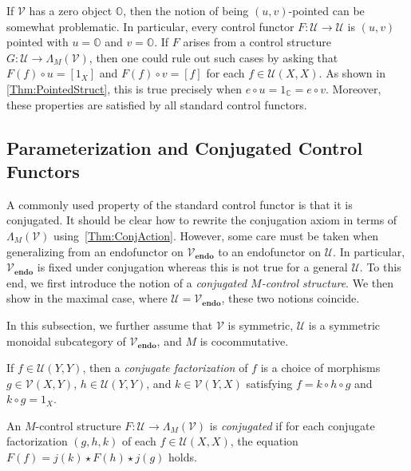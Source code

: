 \begin{exa}
    If $\mathcal{V}$ has a zero object $\mathbb{O}$, then the notion of being $( u, v )$-pointed can be somewhat problematic.
    In particular, every control functor $F: \mathcal{U} \to \mathcal{U}$ is $( u, v )$ pointed with $u = \mathbb{O}$ and $v = \mathbb{O}$.
    If $F$ arises from a control structure $G: \mathcal{U} \to \Lambda_M( \mathcal{V} )$, then one could rule out such cases by asking that $F( f ) \circ u = [ 1_X ]$ and $F( f ) \circ v = [ f ]$ for each $f \in \mathcal{U}( X, X )$.
    As shown in \cref{Thm:PointedStruct}, this is true precisely when $e \circ u = 1_{\mathbb{C}} = e \circ v$.
    Moreover, these properties are satisfied by all standard control functors.
\end{exa}

\subsection{Parameterization and Conjugated Control Functors}
%
A commonly used property of the standard control functor is that it is conjugated.
It should be clear how to rewrite the conjugation axiom in terms of $\Lambda_M( \mathcal{V} )$ using~\cref{Thm:ConjAction}.
However, some care must be taken when generalizing from an endofunctor on $\mathcal{V}_{\mathbf{endo}}$ to an endofunctor on $\mathcal{U}$.
In particular, $\mathcal{V}_{\mathbf{endo}}$ is fixed under conjugation whereas this is not true for a general $\mathcal{U}$.
To this end, we first introduce the notion of a \emph{conjugated $M$-control structure}.
We then show in the maximal case, where $\mathcal{U} = \mathcal{V}_{\mathbf{endo}}$, these two notions coincide.

\begin{nota}
    In this subsection, we further assume that $\mathcal{V}$ is symmetric, $\mathcal{U}$ is a symmetric monoidal subcategory of $\mathcal{V}_{\mathbf{endo}}$, and $M$ is cocommutative.
\end{nota}

\begin{defi}
    If $f \in \mathcal{U}( Y, Y )$, then a \emph{conjugate factorization} of $f$ is a choice of morphisms $g \in \mathcal{V}( X, Y )$, $h \in \mathcal{U}( Y, Y )$, and $k \in \mathcal{V}( Y, X )$ satisfying $f = k \circ h \circ g$ and $k \circ g = 1_X$.
\end{defi}

\begin{defi}
    An $M$-control structure $F: \mathcal{U} \to \Lambda_M( \mathcal{V} )$ is \emph{conjugated} if for each conjugate factorization $( g, h, k )$ of each $f \in \mathcal{U}( X, X )$, the equation $F( f ) = j( k ) \star F( h ) \star j( g )$ holds.
\end{defi}

